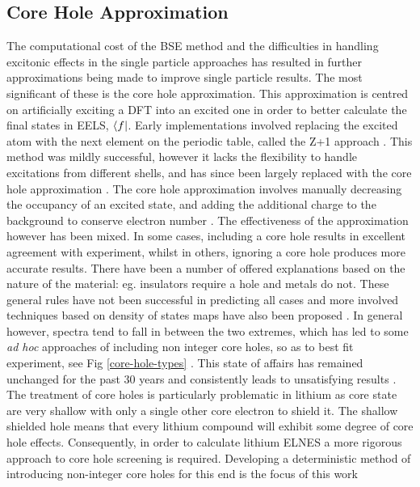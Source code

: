 \subsection{Core Hole Approximation} \label{Core Hole Approximation}
The computational cost of the BSE method and the difficulties in handling excitonic effects in the single particle approaches has resulted in further approximations being made to improve single particle results.  The most significant of these is the core hole approximation.  This approximation is centred on artificially exciting a DFT into an excited one in order to better calculate the final states in EELS, $\bra{f}$.  Early implementations involved replacing the excited atom with the next element on the periodic table, called the Z+1 approach \cite{lee_new_1977}.  This method was mildly successful, however it lacks the flexibility to handle excitations from different shells, and has since been largely replaced with the core hole approximation \cite{hebert_practical_2007}.  The core hole approximation involves manually decreasing the occupancy of an excited state, and adding the additional charge to the background to conserve electron number \cite{wien2k}. The effectiveness of the approximation however has been mixed.  In some cases, including a core hole results in excellent agreement with experiment, whilst in others, ignoring a core hole produces more accurate results.   There have been a number of offered explanations based on the nature of the material: eg. insulators require a hole and metals do not.  These general rules have not been successful in predicting all cases and more involved techniques based on density of states maps have also been proposed \cite{mauchamp_core-hole_2009}.  In general however, spectra tend to fall in between the two extremes, which has led to some \textit{ad hoc} approaches of including non integer core holes, so as to best fit experiment, see Fig \ref{core-hole-types} \cite{hebert_practical_2007, luitz_partial_2001, hebert_improvement_2003, slater_energy_1964}. This state of affairs has remained unchanged for the past 30 years and consistently leads to unsatisfying results \cite{ brydson_further_1988, hardcastle_robust_2017,bad_hole1,bad_hole2, bad_hole3, bad_hole4, bad_hole5, bad_hole6, bad_hole7, bad_hole8,bad_hole9, bad_hole10}. \\
The treatment of core holes is particularly problematic in lithium as core state are very shallow with only a single other core electron to shield it.  The shallow shielded hole means that every lithium compound will exhibit some degree of core hole effects.  Consequently, in order to  calculate lithium ELNES a more rigorous approach to core hole screening is required.  Developing a deterministic method of introducing non-integer core holes for this end is the focus of this work


